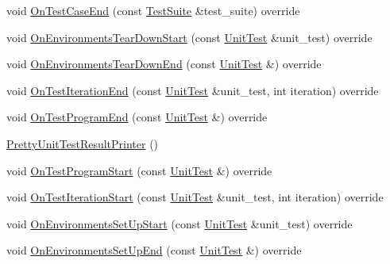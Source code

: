 \begin{DoxyCompactItemize}
\item 
void \mbox{\hyperlink{classtesting_1_1internal_1_1_pretty_unit_test_result_printer_a4d5d603ee674a7929c6361c0fbcb695d}{On\+Test\+Case\+End}} (const \mbox{\hyperlink{classtesting_1_1_test_suite}{Test\+Suite}} \&test\+\_\+suite) override
\item 
void \mbox{\hyperlink{classtesting_1_1internal_1_1_pretty_unit_test_result_printer_a97efe483cbb1c55d32bdc7a997a99f13}{On\+Environments\+Tear\+Down\+Start}} (const \mbox{\hyperlink{classtesting_1_1_unit_test}{Unit\+Test}} \&unit\+\_\+test) override
\item 
void \mbox{\hyperlink{classtesting_1_1internal_1_1_pretty_unit_test_result_printer_a6700b0664749940a93917c5dcc3b90ed}{On\+Environments\+Tear\+Down\+End}} (const \mbox{\hyperlink{classtesting_1_1_unit_test}{Unit\+Test}} \&) override
\item 
void \mbox{\hyperlink{classtesting_1_1internal_1_1_pretty_unit_test_result_printer_a447fc02d3e3af17cef6f0727bab7414a}{On\+Test\+Iteration\+End}} (const \mbox{\hyperlink{classtesting_1_1_unit_test}{Unit\+Test}} \&unit\+\_\+test, int iteration) override
\item 
void \mbox{\hyperlink{classtesting_1_1internal_1_1_pretty_unit_test_result_printer_a26c7e1a921099dd50fbadd2b0ce3692a}{On\+Test\+Program\+End}} (const \mbox{\hyperlink{classtesting_1_1_unit_test}{Unit\+Test}} \&) override
\item 
\mbox{\hyperlink{classtesting_1_1internal_1_1_pretty_unit_test_result_printer_a9219a4263ef0057c98a2a2a41f35ee15}{Pretty\+Unit\+Test\+Result\+Printer}} ()
\item 
void \mbox{\hyperlink{classtesting_1_1internal_1_1_pretty_unit_test_result_printer_a248840fde373e65a25eaaa1d2a0f3065}{On\+Test\+Program\+Start}} (const \mbox{\hyperlink{classtesting_1_1_unit_test}{Unit\+Test}} \&) override
\item 
void \mbox{\hyperlink{classtesting_1_1internal_1_1_pretty_unit_test_result_printer_a0e7e8909452ef92aaf02f4cffde5ee28}{On\+Test\+Iteration\+Start}} (const \mbox{\hyperlink{classtesting_1_1_unit_test}{Unit\+Test}} \&unit\+\_\+test, int iteration) override
\item 
void \mbox{\hyperlink{classtesting_1_1internal_1_1_pretty_unit_test_result_printer_ac17a4a708aca7df5876e48868408a2be}{On\+Environments\+Set\+Up\+Start}} (const \mbox{\hyperlink{classtesting_1_1_unit_test}{Unit\+Test}} \&unit\+\_\+test) override
\item 
void \mbox{\hyperlink{classtesting_1_1internal_1_1_pretty_unit_test_result_printer_a9853207ad1aedfe89c72f8047ac3541a}{On\+Environments\+Set\+Up\+End}} (const \mbox{\hyperlink{classtesting_1_1_unit_test}{Unit\+Test}} \&) override

\end{DoxyCompactItemize}

